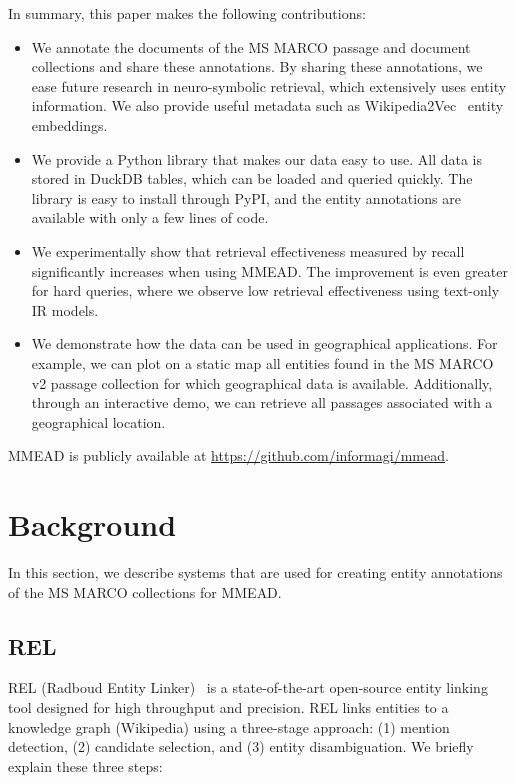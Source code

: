 In summary, this paper makes the following contributions:
 \begin{itemize}
	\item We annotate the documents of the MS MARCO passage and document collections and share these annotations. By sharing these annotations, we ease future research in neuro-symbolic retrieval, which extensively uses entity information. We also provide useful metadata such as Wikipedia2Vec~\cite{wikipedia2vec} entity embeddings. 
	\item We provide a Python library that makes our data easy to use. All data is stored in DuckDB tables, which can be loaded and queried quickly. The library is easy to install through PyPI, and the entity annotations are available with only a few lines of code.
	\item We experimentally show that retrieval effectiveness measured by recall significantly increases when using MMEAD. The improvement is even greater for hard queries, where we observe low retrieval effectiveness using text-only IR models.
	\item We demonstrate how the data can be used in geographical applications. For example, we can plot on a static map all entities found in the MS MARCO v2 passage collection for which geographical data is available. Additionally, through an interactive demo, we can retrieve all passages associated with a geographical location.  
\end{itemize}

MMEAD is publicly available at \url{https://github.com/informagi/mmead}.

\section{Background}
In this section, we describe systems that are used for creating entity annotations of the MS MARCO collections for MMEAD. 

\subsection{REL}
REL (Radboud Entity Linker)~\citep{rel} is a state-of-the-art open-source entity linking tool designed for high throughput and precision. REL links entities to a knowledge graph (Wikipedia) using a three-stage approach: (1) mention detection, (2) candidate selection, and (3) entity disambiguation. We briefly explain these three steps:

